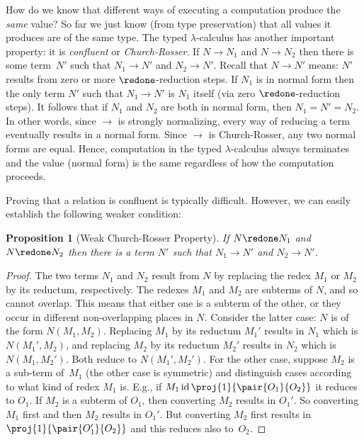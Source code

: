 \documentclass[10pt,a4paper]{article}
\theoremstyle{plain}
\newtheorem{prop}[thm]{Proposition}
\theoremstyle{definition}
\theoremstyle{remark}
\providecommand{\lambd}{\ensuremath{\lambda}}
\providecommand{\ident}{\operatorname{id}}
\providecommand{\red}{\mathrel{\rightarrow}}
\providecommand{\red}{\mathrel{\rightarrow}}
\begin{document}
How do we know that different ways of executing a computation produce
the \emph{same} value? So far we just know (from type preservation)
that all values it produces are of the same type. The typed
$\lambd$-calculus has another important property: it is
\emph{confluent} or \emph{Church-Rosser}. If $N \red N_1$ and $N \red
N_2$ then there is some term~$N'$ such that $N_1 \red N'$ and $N_2 \red
N'$. Recall that $N \red N'$ means: $N'$ results from zero or more
$\redone$-reduction steps. If $N_1$ is in normal form then the only
term $N'$ such that $N_1 \red N'$ is $N_1$ itself (via zero
$\redone$-reduction steps). It follows that if $N_1$ and $N_2$ are
both in normal form, then $N_1 = N' = N_2$. In other words, since
$\red$ is strongly normalizing, every way of reducing a term
eventually results in a normal form. Since $\red$ is Church-Rosser,
any two normal forms are equal. Hence, computation in the typed
$\lambd$-calculus always terminates and the value (normal form) is the
same regardless of how the computation proceeds.

Proving that a relation is confluent is typically difficult. However,
we can easily establish the following weaker condition:

\begin{prop}[Weak Church-Rosser Property]
If $N \redone N_1$ and $N \redone N_2$ then there is a term $N'$ such
that $N_1 \red N'$ and $N_2 \red N'$.
\end{prop}

\begin{proof}
  The two terms $N_1$ and $N_2$ result from $N$ by replacing the redex
  $M_1$ or $M_2$ by its reductum, respectively. The redexes $M_1$ and
  $M_2$ are subterms of $N$, and so cannot overlap. This means that
  either one is a subterm of the other, or they occur in different
  non-overlapping places in $N$. Consider the latter case: $N$ is of
  the form $N(M_1,M_2)$. Replacing $M_1$ by its reductum $M_1'$
  results in $N_1$ which is $N(M_1',M_2)$, and replacing $M_2$ by its
  reductum $M_2'$ results in $N_2$ which is $N(M_1,M_2')$. Both reduce
  to $N(M_1',M_2')$. For the other case, suppose $M_2$ is a sub-term
  of~$M_1$ (the other case is symmetric) and distinguish cases
  according to what kind of redex $M_1$ is. E.g., if $M_1 \ident
  \proj{1}{\pair{O_1}{O_2}}$ it reduces to $O_1$. If $M_2$ is a
  subterm of $O_1$, then converting $M_2$ results in $O_1'$. So
  converting $M_1$ first and then $M_2$ results in $O_1'$. But
  converting $M_2$ first results in $\proj{1}{\pair{O_1'}{O_2}}$ and
  this reduces also to~$O_2$.
\end{proof}
\end{document}
